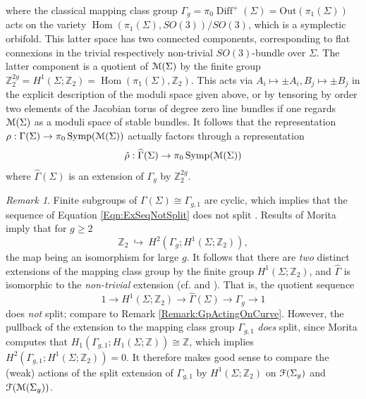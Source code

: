 \documentclass[reqno,10pt]{amsart}
\numberwithin{equation}{section}
\newcommand{\bZ}{{\mathbb Z}}
\newcommand{\scrF}{\EuScript{F}}
\newcommand{\scrM}{\EuScript{M}}
\newcommand{\Hom}{\operatorname{Hom}}
\newcommand{\Symp}{\operatorname{Symp}}
\newcommand{\Diff}{\operatorname{Diff}}
\theoremstyle{remark}
\newtheorem{Remark}[thm]{Remark}
\begin{document}
where the classical mapping class group $\Gamma_g = \pi_0\Diff^+(\Sigma) = \textrm{Out}(\pi_1(\Sigma))$ acts on the variety $\Hom(\pi_1(\Sigma), SO(3))/SO(3)$, which is a symplectic orbifold.  This latter space has two connected components, corresponding to flat connexions in the trivial respectively non-trivial $SO(3)$-bundle over $\Sigma$.  The latter component  is a quotient of $\scrM(\Sigma)$ by the finite group $\bZ_2^{2g} = H^1(\Sigma;\bZ_2) = \Hom(\pi_1(\Sigma),\bZ_2)$. This acts via  $A_i \mapsto \pm A_i, B_j \mapsto \pm B_j$ in the explicit description of the moduli space given above, or by tensoring by order two elements of the Jacobian torus of degree zero line bundles if one regards $\scrM(\Sigma)$ as a moduli space of stable bundles.  It follows that the representation $\rho: \Gamma(\Sigma) \rightarrow \pi_0\Symp(\scrM(\Sigma))$ actually factors through a representation
\[
\hat{\rho}: \widehat{\Gamma}(\Sigma) \rightarrow \pi_0\Symp(\scrM(\Sigma))
\]
where $\widehat{\Gamma}(\Sigma)$ is an extension of $\Gamma_g$ by $\bZ_2^{2g}$. 

\begin{Remark} \label{Remark:GpActingOnModuliSpace}
Finite subgroups of $\Gamma(\Sigma) \cong \Gamma_{g,1}$ are cyclic, which implies that the sequence of Equation \ref{Eqn:ExSeqNotSplit} does not split \cite{FarbMargalit}.  Results of Morita \cite{Morita, Morita2} imply that  for $g\geq 2$
\[
\bZ_2 \ \hookrightarrow \ H^2(\Gamma_g; H^1(\Sigma;\bZ_2)), 
\]  the map being an isomorphism for large $g$.  It follows that there are \emph{two} distinct extensions of the mapping class group by the finite group $H^1(\Sigma;\bZ_2)$, and $\widehat{\Gamma}$ is isomorphic to the \emph{non-trivial} extension (cf. \cite[Section 9]{Earle} and \cite[Proposition 4]{Morita2}).  That is, the quotient sequence 
\begin{equation} \label{Eqn:DoesSplit}
1 \rightarrow H^1(\Sigma;\bZ_2) \rightarrow \widehat{\Gamma}(\Sigma) \rightarrow \Gamma_g \rightarrow 1
\end{equation}
does \emph{not} split; compare to Remark \ref{Remark:GpActingOnCurve}.  However, the pullback of the extension to the mapping class group $\Gamma_{g,1}$  \emph{does} split, since Morita computes that $H_1(\Gamma_{g,1}; H_1(\Sigma;\bZ)) \cong \bZ$, which implies $H^2(\Gamma_{g,1}; H^1(\Sigma; \bZ_2)) =  0.$ 
It therefore makes good sense to compare the (weak) actions of the split extension of $\Gamma_{g,1}$ by $H^1(\Sigma;\bZ_2)$ on $\scrF(\Sigma_g)$ and $\scrF(\scrM(\Sigma_g))$. 
\end{Remark}
\end{document}
